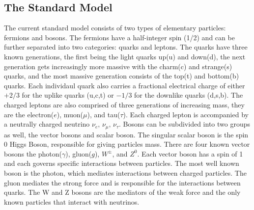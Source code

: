 
\subsection{The Standard Model}
\label{subsec:std_model}
The current standard model consists of two types of elementary particles: fermions and bosons. The fermions have a half-integer spin (1/2) and can be further separated into two categories: quarks and leptons. The quarks have three known generations, the first being the light quarks up(u) and down(d), the next generation gets increasingly more massive with the charm(c) and strange(s) quarks, and the most massive generation consists of the top(t) and bottom(b) quarks. Each individaul quark also carries a fractional electrical charge of either $+2/3$ for the uplike quarks (u,c,t)  or $-1/3$ for the downlike quarks (d,s,b). The charged leptons are also comprised of three generations of increasing mass, they are the electron($e$), muon($\mu$), and tau($\tau$). Each charged lepton is accompanied by a neutrally charged  neutrino $\nu_e , \, \nu_\mu , \, \nu_\tau$. Bosons can be subdivided into two groups as well, the vector bosons and scalar boson. The singular scalar boson is the spin 0 Higgs Boson,  responsible for giving particles mass. There are four known vector bosons the photon($\gamma$), gluon($g$), $W^\pm$, and $Z^0$.  Each  vector boson has a spin of 1 and each governs specific interactions between particles. The most well known boson is the photon, which mediates interactions between charged particles. The gluon mediates the strong force and is responsible for the interactions between quarks. The W and Z bosons are the mediators of the weak force and the only known particles that interact with neutrinos.

